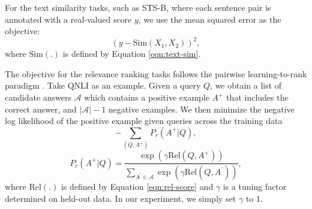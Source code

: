 For the text similarity tasks, such as STS-B, where each sentence pair is annotated with a real-valued score $y$, we use the mean squared error as the objective:
\begin{equation}
(y - \text{Sim}(X_1, X_2))^2,
\label{eqn:msq-loss}
\end{equation}
where $\text{Sim}(.)$ is defined by Equation \ref{eqn:text-sim}.

The objective for the relevance ranking tasks follows the pairwise learning-to-rank paradigm \citep{learning-to-rank2005burges,huang2013dssm}. Take QNLI as an example. Given a query $Q$, we obtain a list of candidate answers $\mathcal{A}$ which contains a positive example $A^+$ that includes the correct answer, and $|\mathcal{A}|-1$ negative examples. We then minimize the negative log likelihood of the positive example given queries across the training data
\begin{equation}
-\sum_{(Q,A^+)} P_r(A^+ | Q),
\label{eqn:ranking-loss}
\end{equation}
\begin{equation}
P_r(A^+ | Q) = \frac{\exp(\gamma \text{Rel}(Q,A^+))}{\sum_{A^{'} \in \mathcal{A}} \exp(\gamma \text{Rel}(Q,A^{'}))},
\label{eqn:ranking-prob}
\end{equation}
where $\text{Rel}(.)$ is defined by Equation \ref{eqn:rel-score} and $\gamma$ is a tuning factor determined on held-out data. In our experiment, we simply set $\gamma$ to 1.

